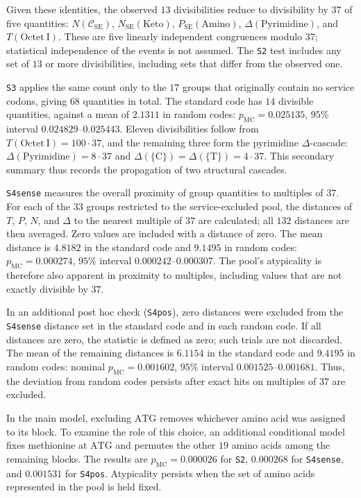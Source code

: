 \documentclass[11pt,a4paper]{article}
\renewcommand{\_}{\origunderscore\allowbreak}
\begin{document}
Given these identities, the observed $13$ divisibilities reduce
to divisibility by $37$ of five quantities:
$N(\mathcal{C}_{\mathrm{SE}})$, $N_{\mathrm{SE}}(\mathrm{Keto})$,
$P_{\mathrm{SE}}(\mathrm{Amino})$, $\Delta(\mathrm{Pyrimidine})$,
and $T(\mathrm{Octet~I})$.
These are five linearly independent congruences modulo $37$;
statistical independence of the events is not assumed.
The \texttt{S2} test includes any set of $13$ or more divisibilities,
including sets that differ from the observed one.

\texttt{S3} applies the same count only to the $17$ groups
that originally contain no service codons, giving $68$
quantities in total. The standard code has $14$ divisible
quantities, against a mean of $2.1311$ in random codes:
$p_{\mathrm{MC}} = 0.025135$,
$95\%$ interval $0.024829$--$0.025443$.
Eleven divisibilities follow from
$T(\mathrm{Octet~I}) = 100 \cdot 37$, and the remaining three
form the pyrimidine $\Delta$-cascade:
$\Delta(\mathrm{Pyrimidine}) = 8 \cdot 37$ and
$\Delta(\{\mathrm{C}\}) = \Delta(\{\mathrm{T}\}) = 4 \cdot 37$.
This secondary summary thus records the propagation of two
structural cascades.

\texttt{S4sense} measures the overall proximity of group
quantities to multiples of $37$. For each of the $33$ groups
restricted to the service-excluded pool, the distances
of $T$, $P$, $N$, and $\Delta$ to the nearest multiple of $37$
are calculated; all $132$ distances are then averaged.
Zero values are included with a distance of zero.
The mean distance is $4.8182$ in the standard code and $9.1495$
in random codes:
$p_{\mathrm{MC}} = 0.000274$,
$95\%$ interval $0.000242$--$0.000307$.
The pool's atypicality is therefore also apparent in proximity
to multiples, including values that are not exactly divisible
by $37$.

In an additional post hoc check (\texttt{S4pos}), zero distances
were excluded from the \texttt{S4sense} distance set in the
standard code and in each random code. If all distances are zero,
the statistic is defined as zero; such trials are not discarded.
The mean of the remaining distances is $6.1154$ in the standard
code and $9.4195$ in random codes: nominal
$p_{\mathrm{MC}} = 0.001602$, $95\%$ interval
$0.001525$--$0.001681$.
Thus, the deviation from random codes persists after exact
hits on multiples of $37$ are excluded.

In the main model, excluding $\mathrm{ATG}$ removes whichever
amino acid was assigned to its block. To examine the role of
this choice, an additional conditional model fixes methionine
at $\mathrm{ATG}$ and permutes the other $19$ amino acids among
the remaining blocks. The results are
$p_{\mathrm{MC}} = 0.000026$ for \texttt{S2},
$0.000268$ for \texttt{S4sense}, and $0.001531$ for
\texttt{S4pos}. Atypicality persists when the set of amino acids
represented in the pool is held fixed.
\end{document}
